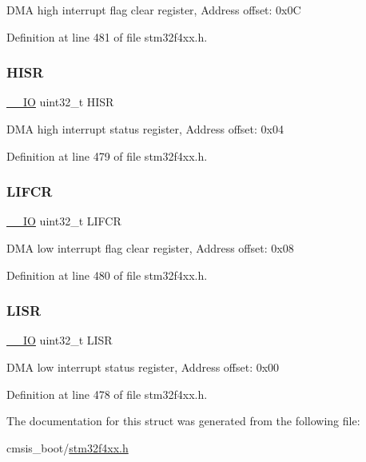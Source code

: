 D\+MA high interrupt flag clear register, Address offset\+: 0x0C 

Definition at line 481 of file stm32f4xx.\+h.

\mbox{\label{struct_d_m_a___type_def_a6fe40f7ac1a18c2726b328b5ec02b262}} 
\subsubsection{\texorpdfstring{H\+I\+SR}{HISR}}
{\footnotesize\ttfamily \hyperlink{group___c_m_s_i_s__core__definitions_gaec43007d9998a0a0e01faede4133d6be}{\+\_\+\+\_\+\+IO} uint32\+\_\+t H\+I\+SR}

D\+MA high interrupt status register, Address offset\+: 0x04 

Definition at line 479 of file stm32f4xx.\+h.

\mbox{\label{struct_d_m_a___type_def_ac4f7bf4cb172024bfc940c00167cd04e}} 
\subsubsection{\texorpdfstring{L\+I\+F\+CR}{LIFCR}}
{\footnotesize\ttfamily \hyperlink{group___c_m_s_i_s__core__definitions_gaec43007d9998a0a0e01faede4133d6be}{\+\_\+\+\_\+\+IO} uint32\+\_\+t L\+I\+F\+CR}

D\+MA low interrupt flag clear register, Address offset\+: 0x08 

Definition at line 480 of file stm32f4xx.\+h.

\mbox{\label{struct_d_m_a___type_def_a5cdef358e9e95b570358e1f6a3a7f492}} 
\subsubsection{\texorpdfstring{L\+I\+SR}{LISR}}
{\footnotesize\ttfamily \hyperlink{group___c_m_s_i_s__core__definitions_gaec43007d9998a0a0e01faede4133d6be}{\+\_\+\+\_\+\+IO} uint32\+\_\+t L\+I\+SR}

D\+MA low interrupt status register, Address offset\+: 0x00 

Definition at line 478 of file stm32f4xx.\+h.



The documentation for this struct was generated from the following file\+:\begin{DoxyCompactItemize}
\item 
cmsis\+\_\+boot/\hyperlink{stm32f4xx_8h}{stm32f4xx.\+h}\end{DoxyCompactItemize}
